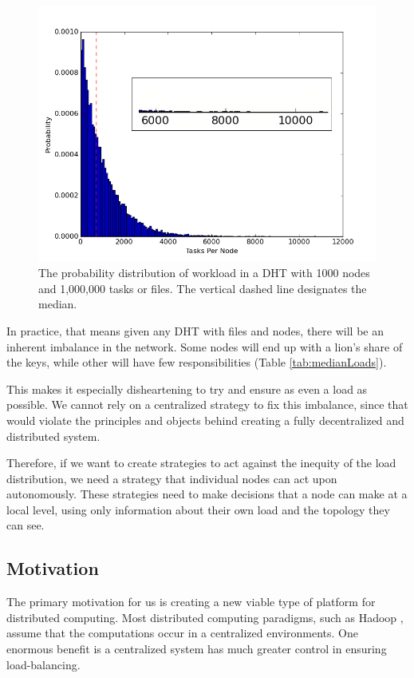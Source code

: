 \begin{figure}
\centering
\includegraphics[width=0.7\linewidth]{figs/workloadDistribution}
\caption[foo]{The probability distribution of workload in a DHT with 1000 nodes and 1,000,000 tasks or files.  The vertical dashed line designates the median.}
\label{fig:workloadDistribution}
\end{figure}


In practice, that means given any DHT with files and nodes, there will be an inherent imbalance in the network.
Some nodes will end up with a lion's share of the keys, while other will have few responsibilities (Table \ref{tab:medianLoads}).

This makes it especially disheartening to try and ensure as even a load as possible.
We cannot rely on a centralized strategy to fix this imbalance, since that would violate the principles and objects behind creating a fully decentralized and distributed system.

Therefore, if we want to create strategies to act against the inequity of the load distribution, we need a strategy that individual nodes can act upon autonomously.
These strategies need to make decisions that a node can make at a local level, using only information about their own load and the topology they can see.


\subsection{Motivation}
The primary motivation for us is creating a new viable type of platform for distributed computing.
Most distributed computing paradigms, such as Hadoop \cite{hadoop}, assume that the computations occur in a centralized environments.
One enormous benefit is a centralized system has much greater control in ensuring load-balancing.

